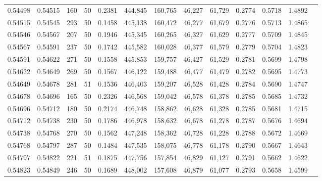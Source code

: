 \begin{tabular}{rrrrrrrrrrrrr}
0.54498 & 0.54515 &   160 &  50 &                                     0.2381 & 444,845 & 160,765 &  46,227 &  61,729 & 0.2774 & 0.5718 & 1.4892 \\
0.54515 & 0.54545 &   293 &  50 &                                     0.1458 & 445,138 & 160,472 &  46,277 &  61,679 & 0.2776 & 0.5713 & 1.4865 \\
0.54546 & 0.54567 &   207 &  50 &                                     0.1946 & 445,345 & 160,265 &  46,327 &  61,629 & 0.2777 & 0.5709 & 1.4845 \\
0.54567 & 0.54591 &   237 &  50 &                                     0.1742 & 445,582 & 160,028 &  46,377 &  61,579 & 0.2779 & 0.5704 & 1.4823 \\
0.54591 & 0.54622 &   271 &  50 &                                     0.1558 & 445,853 & 159,757 &  46,427 &  61,529 & 0.2781 & 0.5699 & 1.4798 \\
0.54622 & 0.54649 &   269 &  50 &                                     0.1567 & 446,122 & 159,488 &  46,477 &  61,479 & 0.2782 & 0.5695 & 1.4773 \\
0.54649 & 0.54678 &   281 &  51 &                                     0.1536 & 446,403 & 159,207 &  46,528 &  61,428 & 0.2784 & 0.5690 & 1.4747 \\
0.54678 & 0.54696 &   165 &  50 &                                     0.2326 & 446,568 & 159,042 &  46,578 &  61,378 & 0.2785 & 0.5685 & 1.4732 \\
0.54696 & 0.54712 &   180 &  50 &                                     0.2174 & 446,748 & 158,862 &  46,628 &  61,328 & 0.2785 & 0.5681 & 1.4715 \\
0.54712 & 0.54738 &   230 &  50 &                                     0.1786 & 446,978 & 158,632 &  46,678 &  61,278 & 0.2787 & 0.5676 & 1.4694 \\
0.54738 & 0.54768 &   270 &  50 &                                     0.1562 & 447,248 & 158,362 &  46,728 &  61,228 & 0.2788 & 0.5672 & 1.4669 \\
0.54768 & 0.54797 &   287 &  50 &                                     0.1484 & 447,535 & 158,075 &  46,778 &  61,178 & 0.2790 & 0.5667 & 1.4643 \\
0.54797 & 0.54822 &   221 &  51 &                                     0.1875 & 447,756 & 157,854 &  46,829 &  61,127 & 0.2791 & 0.5662 & 1.4622 \\
0.54823 & 0.54849 &   246 &  50 &                                     0.1689 & 448,002 & 157,608 &  46,879 &  61,077 & 0.2793 & 0.5658 & 1.4599 \\

\end{tabular}
